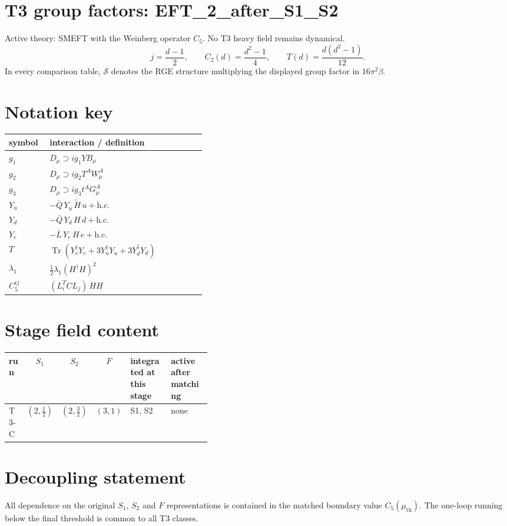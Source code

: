 \documentclass[9pt]{article}
\begin{document}
\section*{T3 group factors: EFT\_2\_after\_S1\_S2}
Active theory: SMEFT with the Weinberg operator $C_5$.  No T3 heavy field remains dynamical.
\[j=\frac{d-1}{2},\qquad C_2(d)=\frac{d^2-1}{4},\qquad T(d)=\frac{d(d^2-1)}{12}.\]
In every comparison table, $\mathcal{S}$ denotes the RGE structure multiplying the displayed group factor in $16\pi^2\beta$.
\section*{Notation key}
\begin{longtable}{@{}p{0.19\linewidth}p{0.73\linewidth}@{}}
\toprule
symbol & interaction / definition \\
\midrule
$g_1$ & $D_\mu\supset i g_1 Y B_\mu$ \\
$g_2$ & $D_\mu\supset i g_2 T^A W_\mu^A$ \\
$g_3$ & $D_\mu\supset i g_3 t^A G_\mu^A$ \\
$Y_u$ & $-\bar Q\,Y_u\,\widetilde H\,u+\mathrm{h.c.}$ \\
$Y_d$ & $-\bar Q\,Y_d\,H\,d+\mathrm{h.c.}$ \\
$Y_e$ & $-\bar L\,Y_e\,H\,e+\mathrm{h.c.}$ \\
$T$ & $\operatorname{Tr}\!\left(Y_e^\dagger Y_e+3Y_u^\dagger Y_u+3Y_d^\dagger Y_d\right)$ \\
$\lambda_1$ & $\frac12\lambda_1(H^\dagger H)^2$ \\
$C_5^{ij}$ & $(L_i^T C L_j)\,H H$ \\
\bottomrule
\end{longtable}
\section*{Stage field content}
\begin{longtable}{@{}lccc p{0.20\linewidth}p{0.20\linewidth}@{}}
\toprule
run & $S_1$ & $S_2$ & $F$ & integrated at this stage & active after matching \\
\midrule
T3-C & $(2,\frac{1}{2})$ & $(2,\frac{3}{2})$ & $(3,1)$ & S1, S2 & none \\
\bottomrule
\end{longtable}
\section*{Decoupling statement}
All dependence on the original $S_1$, $S_2$ and $F$ representations is contained in the matched boundary value $C_5(\mu_{\mathrm{th}})$.  The one-loop running below the final threshold is common to all T3 classes.
\end{document}
